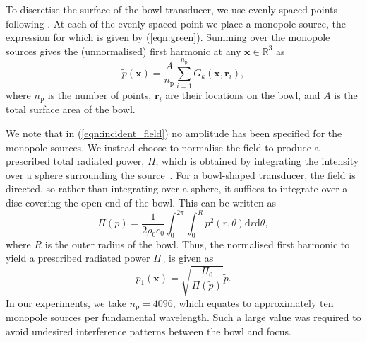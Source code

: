 \documentclass[preprint]{JASA}
\newcommand{\br}{\mathbf{r}}
\newcommand{\sd}{\mbox{d}}
\newcommand{\bx}{\mathbf{x}}
\newcommand{\red}[1]{{\color{red} #1}}
\begin{document}
To discretise the surface of the bowl transducer, we use evenly spaced points
following \cite{deserno2004generate}. At each of the evenly spaced point we 
place a monopole source, the expression for which is given by (\ref{eqn:green}). 
Summing over the monopole sources gives the (unnormalised) first harmonic at any 
$\bx\in\mathbb{R}^3$ as
\begin{equation}
    \tilde{p}(\bx) = \frac{A}{n_{\text{p}}}\sum_{i=1}^{n_{\text{p}}}G_k(\bx,\br_i),
    \label{eqn:incident_field}
\end{equation}
where $n_{\text{p}}$ is the number of points, $\br_i$ are their locations on the bowl,
and $A$ is the total surface area of the bowl.

We note that in (\ref{eqn:incident_field}) no amplitude has been specified for the 
monopole sources. We instead choose to normalise the field to produce a prescribed 
total radiated power, $\Pi$, which is obtained by integrating the intensity over 
a sphere surrounding the source~\cite{kinsler1999fundamentals}. For a bowl-shaped 
transducer, the field is directed, so rather than integrating over a sphere, 
it suffices to integrate over a disc covering the open end of the bowl. This 
can be written as
\begin{equation}
    \Pi(p) = \frac{1}{2\rho_0 c_0}\int_{0}^{2\pi}\int_{0}^R 
    p^2(r,\theta)\sd r \sd \theta,
\end{equation}
where $R$ is the outer radius of the bowl. Thus, the normalised first harmonic 
to yield a prescribed radiated power $\Pi_0$ is given as 
\begin{equation}
    p_1(\bx) = \sqrt{\frac{\Pi_0}{\Pi(\tilde{p})}}\tilde{p}.
\end{equation}
In our experiments, we take $n_{\text{p}}=4096$, \red{which equates to approximately 
ten monopole sources per fundamental wavelength}. Such a large value was required 
to avoid undesired interference patterns between the bowl and focus.
\end{document}
